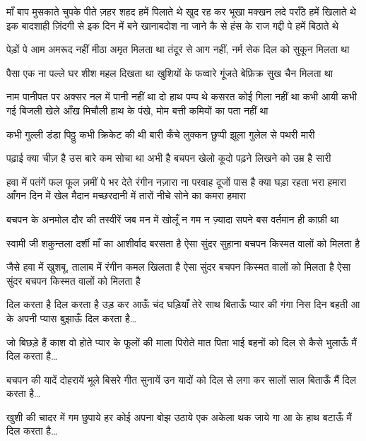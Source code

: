 माँ बाप मुसकाते चुपके पीते ज़हर
शहद हमें पिलाते थे
खुद रह कर भूखा
मक्खन लदे पराँठे हमें खिलाते थे
इक बादशाही ज़िंदगी से
इक दिन में बने खानाबदोश
ना जाने कै से हंस के
राज गद्दी पे हमें बिठाते थे



पेड़ों पे आम अमरूद नहीं
मीठा अमृत मिलता था
तंदूर से आग नहीं, नर्म सेक
दिल को सुकून मिलता था

पैसा एक ना पल्ले
घर शीश महल दिखता था
खुशियों के फव्वारे गूंजते
बेफ़िक्र सुख चैन मिलता था


नाम पानीपत पर अक्सर नल में पानी नहीं था
दो हाथ पम्प थे कसरत कोई गिला नहीं था
कभी आयी कभी गई 
बिजली खेले आँख मिचौली
हाथ के पंखे, मोम बत्ती
कमियों का पता नहीं था





कभी गुल्ली डंडा पिठ्ठु
कभी क्रिकेट की थी बारी
कँचे लुक्कन छुप्पी झूला
गुलेल से पथरी मारी

पढ़ाई क्या चीज़ है
उस बारे कम सोचा था
अभी है बचपन खेलो कूदो
पढ़ने लिखने को उम्र है सारी


हवा में पतंगें फल फूल ज़मीं पे
भर देते रंगीन नज़ारा
ना परवाह दूजों पास है क्या
घड़ा रहता भरा हमारा
आँगन दिन में खेल मैदान
मच्छरदानी में तारों नीचे
सोने का कमरा हमारा




बचपन के अनमोल दौर की
तस्वीरें जब मन में खोलूँ
न गम न ज़्यादा सपने
बस वर्तमान ही काफ़ी था

स्वामी जी शकुन्तला दर्शी
माँ का आशीर्वाद बरसता है
ऐसा सुंदर सुहाना बचपन
किस्मत वालों को मिलता है


जैसे हवा में खुशबू, तालाब में
रंगीन कमल खिलता है
ऐसा सुंदर बचपन
किस्मत वालों को मिलता है
ऐसा सुंदर बचपन
किस्मत वालों को मिलता है

दिल करता है
दिल करता है उड़ कर आऊँ
चंद घड़ियाँ तेरे साथ बिताऊँ
प्यार की गंगा निस दिन बहती
आ के अपनी प्यास बुझाऊँ
दिल करता है…





जो बिछड़े हैं काश वो होते
प्यार के फूलों की माला पिरोते
मात पिता भाई बहनों को
दिल से कैसे भुलाऊँ मैं
दिल करता है…






बचपन की यादें दोहरायें
भूले बिसरे गीत सुनायें
उन यादों को दिल से लगा कर
सालों साल बिताऊँ मैं
दिल करता है…






खुशी की चादर में गम छुपाये
हर कोई अपना बोझ उठाये
एक अकेला थक जाये गा
आ के हाथ बटाऊँ मैं
दिल करता है…






